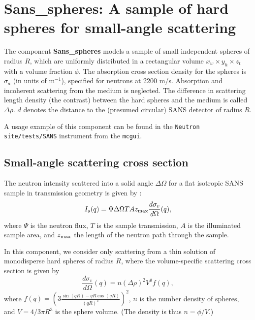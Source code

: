 \section{Sans\_spheres: A sample of hard spheres for small-angle scattering}
\label{sans}


The component {\bf Sans\_spheres} models a sample of small independent
spheres of radius $R$, which are uniformly distributed
in a rectangular volume $x_w \times y_h \times z_t$ with a volume
fraction $\phi$. The absorption cross section density for the spheres
is $\sigma_a$ (in units of m$^{-1}$), specified
for neutrons at 2200 m/s. Absorption and incoherent scattering
from the medium is neglected.
The difference in scattering length density
(the contrast) between the hard spheres and the medium is called $\Delta \rho$.
$d$ denotes the distance to the (presumed circular) SANS detector of radius $R$.

A usage example of this component can be found in the \verb+Neutron site/tests/SANS+ instrument from the \verb+mcgui+.

\subsection{Small-angle scattering cross section}
The neutron intensity scattered into a solid angle $\Delta \Omega$
for a flat isotropic SANS sample in transmission geometry
is given by \cite{ILLblue}:
\begin{equation}
I_s(q) = \Psi \Delta\Omega T A z_{\rm max} \frac{d\sigma_v}{d\Omega}(q) ,
\end{equation}
where $\Psi$ is the neutron flux, $T$ is the sample transmission,
$A$ is the illuminated sample area, and $z_{\rm max}$ the length of
the neutron path through the sample.

In this component, we consider only scattering from a thin solution
of monodisperse hard spheres of radius $R$, where the volume-specific
scattering cross section is given by \cite{ILLblue}
\begin{equation}
\frac{d\sigma_v}{d\Omega}(q) =
  n (\Delta\rho)^2 V^2 f(q)  ,
\end{equation}
where $f(q) = \left( 3\frac{\sin(qR)-qR\cos(qR)}{(qR)^3} \right)^2$,
$n$ is the number density of spheres, and $V = 4 / 3 \pi R^3$ is the
sphere volume. (The density is thus $n = \phi/V$.)

